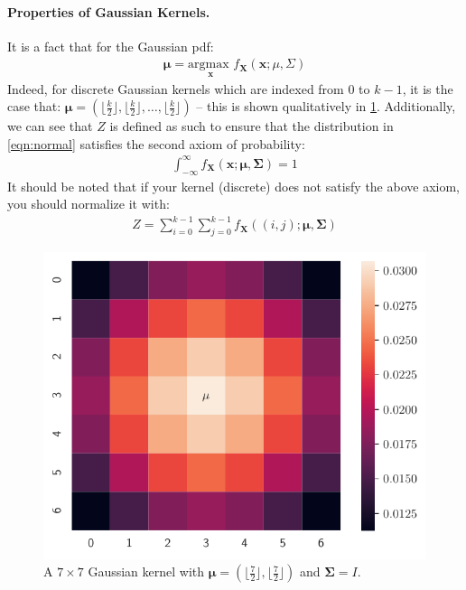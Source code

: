 \documentclass{article}
\begin{document}
\paragraph{Properties of Gaussian Kernels.}
It is a fact that for the Gaussian pdf:
\begin{align}
    \boldsymbol{\mu} = \underset{\boldsymbol{x}}{\text{argmax }} f_{\boldsymbol{X}}\left(\boldsymbol{x}; \mu, \Sigma \right)
\end{align}
Indeed, for discrete Gaussian kernels which are indexed from \(0\) to \(k - 1\), it is the case that:
\(\boldsymbol{\mu} = \left( \lfloor \frac{k}{2} \rfloor, \lfloor \frac{k}{2} \rfloor, \dots, \lfloor \frac{k}{2} \rfloor \right) \) -- this is shown qualitatively in \cref{fig:gaussian-7x7}.
Additionally, we can see that \(Z\) is defined as such to ensure that the distribution in \cref{eqn:normal} satisfies the second axiom of probability:
\begin{align}
    \int_{-\infty}^{\infty} f_{\boldsymbol{X}}\left(\boldsymbol{x}; \boldsymbol{\mu}, \boldsymbol{\Sigma}\right) = 1
\end{align}
It should be noted that if your kernel (discrete) does not satisfy the above axiom, you should normalize it with:
\begin{align}
    Z = \sum_{i=0}^{k-1}\sum_{j=0}^{k-1} f_{\boldsymbol{X}}\left( (i, j); \boldsymbol{\mu}, \boldsymbol{\Sigma} \right)
\end{align}

\begin{figure}
    \centering
    \includegraphics{gaussian-7x7.pdf}
    \caption{A \(7 \times 7 \) Gaussian kernel with \(\boldsymbol{\mu} = (\lfloor \frac{7}{2} \rfloor, \lfloor \frac{7}{2} \rfloor)\) and \(\boldsymbol{\Sigma} = I\).}
    \label{fig:gaussian-7x7}
\end{figure}
\end{document}
